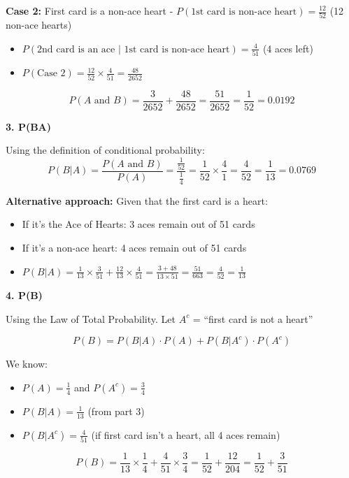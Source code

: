\documentclass[
  11pt,
]{article}
\begin{document}
\textbf{Case 2:} First card is a non-ace heart -
\(P(\text{1st card is non-ace heart}) = \frac{12}{52}\) (12 non-ace
hearts)

\begin{itemize}
\item
  \(P(\text{2nd card is an ace | 1st card is non-ace heart}) = \frac{4}{51}\)
  (4 aces left)
\item
  \(P(\text{Case 2}) = \frac{12}{52} \times \frac{4}{51} = \frac{48}{2652}\)
\end{itemize}

\[P(A \text{ and } B) = \frac{3}{2652} + \frac{48}{2652} = \frac{51}{2652} = \boxed{\frac{1}{52} = 0.0192}\]

\textbf{3. P(B\textbar A)}

Using the definition of conditional probability:
\[P(B|A) = \frac{P(A \text{ and } B)}{P(A)} = \frac{\frac{1}{52}}{\frac{1}{4}} = \frac{1}{52} \times \frac{4}{1} = \boxed{\frac{4}{52} = \frac{1}{13} = 0.0769}\]

\textbf{Alternative approach:} Given that the first card is a heart:

\begin{itemize}
\item
  If it's the Ace of Hearts: 3 aces remain out of 51 cards
\item
  If it's a non-ace heart: 4 aces remain out of 51 cards
\item
  \(P(B|A) = \frac{1}{13} \times \frac{3}{51} + \frac{12}{13} \times \frac{4}{51} = \frac{3 + 48}{13 \times 51} = \frac{51}{663} = \frac{4}{52} = \frac{1}{13}\)
\end{itemize}

\textbf{4. P(B)}

Using the Law of Total Probability. Let \(A^c\) = ``first card is not a
heart''

\[P(B) = P(B|A) \cdot P(A) + P(B|A^c) \cdot P(A^c)\]

We know:

\begin{itemize}
\item
  \(P(A) = \frac{1}{4}\) and \(P(A^c) = \frac{3}{4}\)
\item
  \(P(B|A) = \frac{1}{13}\) (from part 3)
\item
  \(P(B|A^c) = \frac{4}{51}\) (if first card isn't a heart, all 4 aces
  remain)
\end{itemize}

\[P(B) = \frac{1}{13} \times \frac{1}{4} + \frac{4}{51} \times \frac{3}{4} = \frac{1}{52} + \frac{12}{204} = \frac{1}{52} + \frac{3}{51}\]
\end{document}
